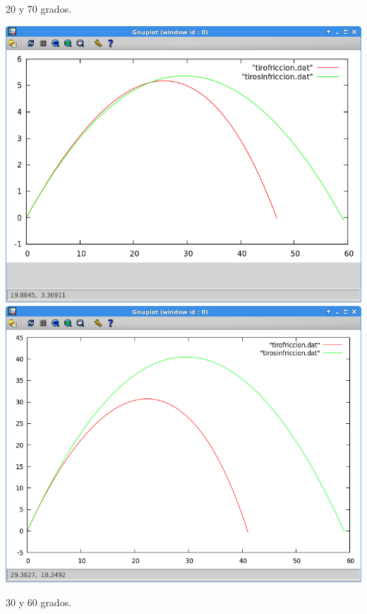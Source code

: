 \documentclass[12pt]{article}
\begin{document}
\begin{large}
20 y 70 grados.
\end{large}
\begin{center}
\includegraphics[scale=0.8]{producto620.png}
\includegraphics[scale=0.8]{producto670.png}
\end{center}
\begin{large}
30 y 60 grados.
\end{large}
\end{document}
